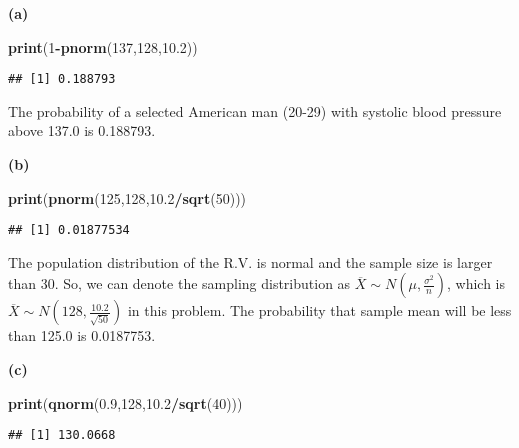 \documentclass[
]{article}
\newenvironment{Shaded}{\begin{snugshade}}{\end{snugshade}}
\newcommand{\DecValTok}[1]{\textcolor[rgb]{0.00,0.00,0.81}{#1}}
\newcommand{\FloatTok}[1]{\textcolor[rgb]{0.00,0.00,0.81}{#1}}
\newcommand{\FunctionTok}[1]{\textcolor[rgb]{0.13,0.29,0.53}{\textbf{#1}}}
\newcommand{\NormalTok}[1]{#1}
\newcommand{\SpecialCharTok}[1]{\textcolor[rgb]{0.81,0.36,0.00}{\textbf{#1}}}
\begin{document}
\textbf{(a)}

\begin{Shaded}
\begin{Highlighting}[]
\FunctionTok{print}\NormalTok{(}\DecValTok{1}\SpecialCharTok{{-}}\FunctionTok{pnorm}\NormalTok{(}\DecValTok{137}\NormalTok{,}\DecValTok{128}\NormalTok{,}\FloatTok{10.2}\NormalTok{))}
\end{Highlighting}
\end{Shaded}

\begin{verbatim}
## [1] 0.188793
\end{verbatim}

The probability of a selected American man (20-29) with systolic blood
pressure above 137.0 is 0.188793.

\textbf{(b)}

\begin{Shaded}
\begin{Highlighting}[]
\FunctionTok{print}\NormalTok{(}\FunctionTok{pnorm}\NormalTok{(}\DecValTok{125}\NormalTok{,}\DecValTok{128}\NormalTok{,}\FloatTok{10.2}\SpecialCharTok{/}\FunctionTok{sqrt}\NormalTok{(}\DecValTok{50}\NormalTok{)))}
\end{Highlighting}
\end{Shaded}

\begin{verbatim}
## [1] 0.01877534
\end{verbatim}

The population distribution of the R.V. is normal and the sample size is
larger than 30. So, we can denote the sampling distribution as
\(\overline{X}\sim N(\mu,\frac{\sigma^{2}}{n})\), which is
\(\overline{X}\sim N(128,\frac{10.2}{\sqrt{50}})\) in this problem. The
probability that sample mean will be less than 125.0 is 0.0187753.

\textbf{(c)}

\begin{Shaded}
\begin{Highlighting}[]
\FunctionTok{print}\NormalTok{(}\FunctionTok{qnorm}\NormalTok{(}\FloatTok{0.9}\NormalTok{,}\DecValTok{128}\NormalTok{,}\FloatTok{10.2}\SpecialCharTok{/}\FunctionTok{sqrt}\NormalTok{(}\DecValTok{40}\NormalTok{)))}
\end{Highlighting}
\end{Shaded}

\begin{verbatim}
## [1] 130.0668
\end{verbatim}
\end{document}
